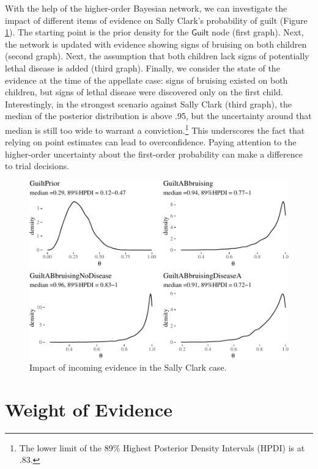 \documentclass[
  10pt,
  dvipsnames,enabledeprecatedfontcommands]{scrartcl}
\newcommand{\s}[1]{\mbox{$\mathsf{#1}$}}
\begin{document}
With the help of the higher-order Bayesian network, we can investigate
the impact of different items of evidence on Sally Clark's probability
of guilt (Figure \ref{fig:SCwithHOP2}). The starting point is the prior
density for the \s{Guilt} node (first graph). Next, the network is
updated with evidence showing signs of bruising on both children (second
graph). Next, the assumption that both children lack signs of
potentially lethal disease is added (third graph). Finally, we consider
the state of the evidence at the time of the appellate case: signs of
bruising existed on both children, but signs of lethal disease were
discovered only on the first child. Interestingly, in the strongest
scenario against Sally Clark (third graph), the median of the posterior
distribution is above .95, but the uncertainty around that median is
still too wide to warrant a conviction.\footnote{The lower limit of the
  89\% Highest Posterior Density Intervals (HPDI) is at .83.} This
underscores the fact that relying on point estimates can lead to
overconfidence. Paying attention to the higher-order uncertainty about
the first-order probability can make a difference to trial decisions.

\begin{figure}[H]

\begin{center}\includegraphics[width=0.9\linewidth]{chapter-outline_files/figure-latex/SCwithHOP2-1} \end{center}


\caption{Impact of incoming evidence in the Sally Clark case.}
\label{fig:SCwithHOP2}
\end{figure}

\hypertarget{weight-of-evidence}{%
\section{Weight of Evidence}\label{weight-of-evidence}}
\end{document}
